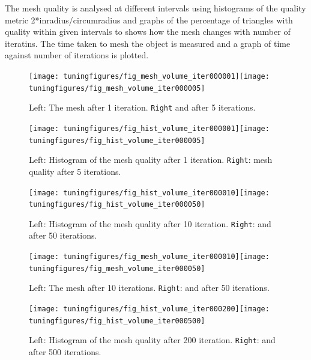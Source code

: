 \documentclass[10pt,a4paper]{book}
\begin{document}


The mesh quality is analysed at different intervals using histograms
of the quality metric 2*inradius/circumradius and graphs of the
percentage of triangles with quality within given intervals to shows how the mesh changes with number of iteratins. The time taken to mesh the object is
measured and a graph of time against number of iterations is plotted. 

\begin{figure}[tbhp]
\centerline{\texttt{[image: tuningfigures/fig\_mesh\_volume\_iter000001]}\hspace{3cm}\texttt{[image: tuningfigures/fig\_mesh\_volume\_iter000005]}}
\caption{\label{fig:fig_mesh_volume_iter000001} Left: The mesh after 1 iteration. \texttt{Right} and after 5 iterations.}
\end{figure}

\begin{figure}[tbhp]
\centerline{\texttt{[image: tuningfigures/fig\_hist\_volume\_iter000001]}\hspace{3cm}\texttt{[image: tuningfigures/fig\_hist\_volume\_iter000005]}}
\caption{\label{fig:fig_hist_volume_iter000001} Left: Histogram of the mesh quality after 1 iteration. \texttt{Right}: mesh quality after 5 iterations.}
\end{figure}

\begin{figure}[tbhp]
\centerline{\texttt{[image: tuningfigures/fig\_hist\_volume\_iter000010]}\hspace{3cm}\texttt{[image: tuningfigures/fig\_hist\_volume\_iter000050]}}
\caption{\label{fig:fig_hist_volume_iter000010} Left: Histogram of the mesh quality after 10 iteration. \texttt{Right}: and after 50 iterations.}
\end{figure}

\begin{figure}[tbhp]
\centerline{\texttt{[image: tuningfigures/fig\_mesh\_volume\_iter000010]}\hspace{3cm}\texttt{[image: tuningfigures/fig\_mesh\_volume\_iter000050]}}
\caption{\label{fig:fig_mesh_volume_iter000010} Left: The mesh after 10 iterations. \texttt{Right}: and after 50 iterations.}
\end{figure}

\begin{figure}[tbhp]
\centerline{\texttt{[image: tuningfigures/fig\_hist\_volume\_iter000200]}\hspace{3cm}\texttt{[image: tuningfigures/fig\_hist\_volume\_iter000500]}}
\caption{\label{fig:fig_hist_volume_iter000200} Left: Histogram of the mesh quality after 200 iteration. \texttt{Right}: and after 500 iterations.}
\end{figure}
\end{document}
